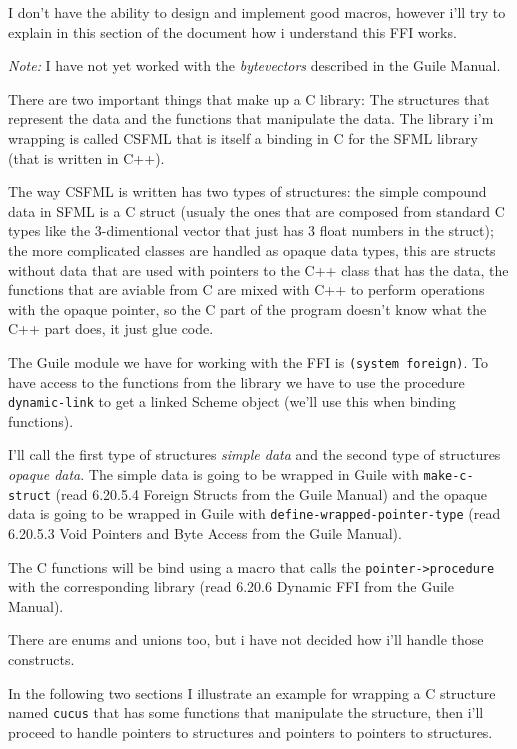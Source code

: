 \documentclass[latterpaper, leqno]{article}
\begin{document}
I don't have the ability to design and implement good macros, however i'll try to explain in this section of the document how i understand this FFI works.

\emph{Note:} I have not yet worked with the \emph{bytevectors} described in the Guile Manual.

\bigskip

There are two important things that make up a C library: The structures that represent the data and the functions that manipulate the data. The library i'm wrapping is called CSFML that is itself a binding in C for the SFML library (that is written in C++).

The way CSFML is written has two types of structures: the simple compound data in SFML is a C struct (usualy the ones that are composed from standard C types like the 3-dimentional vector that just has 3 float numbers in the struct); the more complicated classes are handled as opaque data types, this are structs without data that are used with pointers to the C++ class that has the data, the functions that are aviable from C are mixed with C++ to perform operations with the opaque pointer, so the C part of the program doesn't know what the C++ part does, it just glue code.

The Guile module we have for working with the FFI is \texttt{(system foreign)}. To have access to the functions from the library we have to use the procedure \texttt{dynamic-link} to get a linked Scheme object (we'll use this when binding functions).

I'll call the first type of structures \emph{simple data} and the second type of structures \emph{opaque data}. The simple data is going to be wrapped in Guile with \texttt{make-c-struct} (read 6.20.5.4 Foreign Structs from the Guile Manual) and the opaque data is going to be wrapped in Guile with \texttt{define-wrapped-pointer-type} (read 6.20.5.3 Void Pointers and Byte Access from the Guile Manual).

The C functions will be bind using a macro that calls the \texttt{pointer->procedure} with the corresponding library (read 6.20.6 Dynamic FFI from the Guile Manual).

There are enums and unions too, but i have not decided how i'll handle those constructs.

\bigskip

In the following two sections I illustrate an example for wrapping a C structure named \texttt{cucus} that has some functions that manipulate the structure, then i'll proceed to handle pointers to structures and pointers to pointers to structures.
\end{document}
